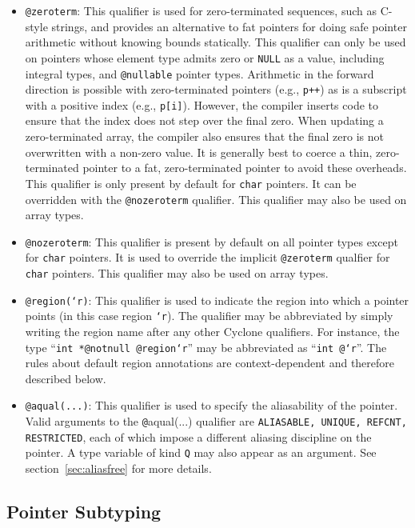 \begin{itemize}
\item \texttt{@zeroterm}:  This qualifier is used for zero-terminated
sequences, such as C-style strings, and provides an alternative to
fat pointers for doing safe pointer arithmetic without knowing 
bounds statically.  This qualifier can only be used on pointers whose
element type admits zero or \texttt{NULL} as a value, including
integral types, and \texttt{@nullable} pointer types.  Arithmetic
in the forward direction is possible with zero-terminated pointers
(e.g., \texttt{p++}) as is a subscript with a positive index
(e.g., \texttt{p[i]}).  However, the compiler inserts code to ensure
that the index does not step over the final zero.  When updating
a zero-terminated array, the compiler also ensures that the final
zero is not overwritten with a non-zero value.  It is generally best
to coerce a thin, zero-terminated pointer to a fat, zero-terminated
pointer to avoid these overheads.  This qualifier is 
only present by default for \texttt{char} pointers.  It can be
overridden with the \texttt{@nozeroterm} qualifier.  This qualifier
may also be used on array types.

\item \texttt{@nozeroterm}:  
This qualifier is present by default
on all pointer types except for \texttt{char} pointers.  It is
used to override the implicit \texttt{@zeroterm} qualfier for
\texttt{char} pointers.  This qualifier may also be used on array types.

\item \texttt{@region(`r)}:  This qualifier is used to indicate the
region into which a pointer points (in this case region \texttt{`r}).
The qualifier may be abbreviated by simply writing the region name
after any other Cyclone qualifiers.  
For instance, the type ``\texttt{int *@notnull @region{`r}}''
may be abbreviated as ``\texttt{int @`r}''.  The rules about default
region annotations are context-dependent and therefore described below.

\item \texttt{@aqual(...)}: This qualifier is used to specify the
  aliasability of the pointer. Valid arguments to the {\texttt
  @aqual(...)} qualifier are {\tt ALIASABLE, UNIQUE, REFCNT,
  RESTRICTED}, each of which impose a different aliasing discipline on
  the pointer. A type variable of kind {\tt Q} may also appear as an
  argument. See section~\ref{sec:aliasfree} for more details.
\end{itemize}

\subsection{Pointer Subtyping}

